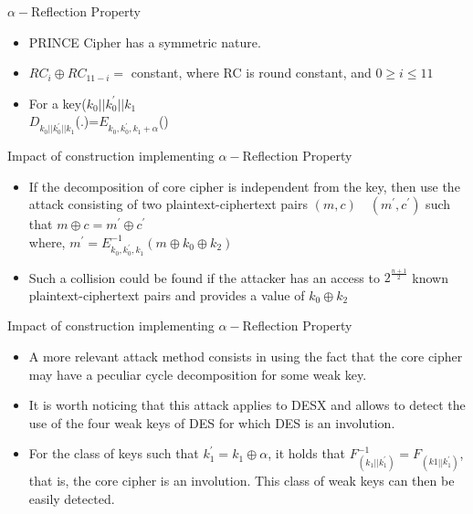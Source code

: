 \begin{frame}{$\alpha-$Reflection Property}
\begin{itemize}
    \item PRINCE Cipher has a symmetric nature.
    \item $RC_{i} \oplus RC_{11-i}=$ constant, where RC is round constant, and $0\geq i\leq 11$
    \item For a key($k_{0}||k^{'}_{0}||k_{1}$ 
    \\
    $D_{k_{0}||k_{0}^{'}||k_{1}}$(.)=$E_{k_{0},k^{'}_{0},k_{1}+\alpha}$()
\end{itemize}
    
\end{frame}
\begin{frame}{Impact of construction implementing $\alpha-$Reflection Property}
\begin{itemize}
    \item If the decomposition of core cipher is independent from the key, then use the attack consisting of two plaintext-ciphertext pairs $(m,c) \quad (m^{'},c^{'})$
    such that $m \oplus c=m^{'} \oplus c^{'}$
    \\
    where, $m^{'}=E^{-1}_{k_{0},k^{'}_{0},k_{1}}(m \oplus k_{0} \oplus k_{2})$
    \item Such a collision could be found if the attacker has an access to $2^{\frac{n+1}{2}}$ known plaintext-ciphertext pairs and provides a value of $k_{0} \oplus k_{2}$
\end{itemize}
    
\end{frame}
\begin{frame}{Impact of construction implementing $\alpha-$Reflection Property}
\begin{itemize}
    \item A more relevant attack method consists
in using the fact that the core cipher may have a peculiar cycle decomposition for some weak key.
\item It is worth noticing that this attack applies to
DESX and allows to detect the use of the four weak keys of DES for which DES is an involution.
\item For the class of keys such that $k^{'}_{1} = k_{1} \oplus \alpha$, it holds that $F^{−1}_{(k_{1}||k^{'}_{1})} =F_{(k1||k^{'}_{1})}$, that is, the core cipher is an involution. This class of weak keys can then be
easily detected.
\end{itemize}
    
\end{frame}